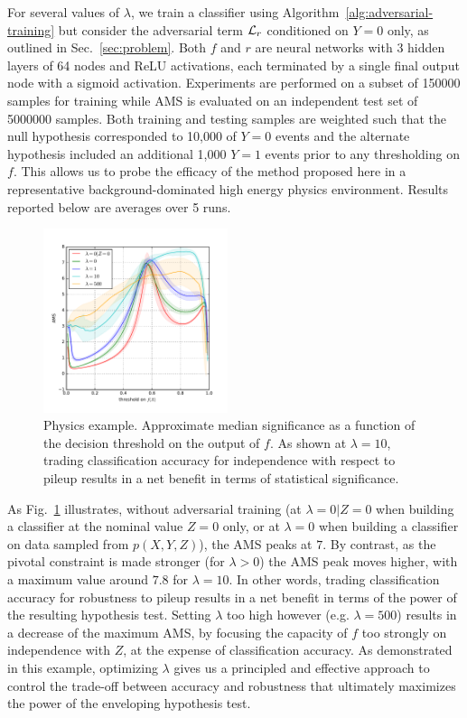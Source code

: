 \documentclass[twocolumn,superscriptaddress,aps]{revtex4-1}
\theoremstyle{plain}
\begin{document}
For several values of $\lambda$, we train a classifier
using  Algorithm~\ref{alg:adversarial-training} but consider the adversarial
term ${\cal L}_r$ conditioned on $Y=0$ only, as outlined in
Sec.~\ref{sec:problem}. Both $f$ and $r$ are neural networks with 3 hidden
layers of 64 nodes and ReLU activations, each terminated by a single final
output node with a sigmoid activation. Experiments are performed on a subset of
150000 samples for training while AMS is evaluated on an independent test set of
5000000 samples. Both training and testing samples are weighted such that the
null hypothesis corresponded to 10,000  of $Y=0$ events and the alternate
hypothesis included an additional 1,000 $Y=1$ events prior to any thresholding on $f$.
This allows us to probe the efficacy of the
method proposed here in a representative background-dominated high energy physics environment. 
Results reported below are averages over 5 runs.

\begin{figure}
    \includegraphics[width=0.48\textwidth]{figures/ams.pdf}
    \caption{Physics example. Approximate median significance as a function of the decision threshold
             on the output of $f$.  As shown at $\lambda=10$, trading
             classification accuracy for independence with respect to pileup
             results in a net benefit in terms of statistical significance.}
    \label{fig:physics-ams}
\end{figure}

As  Fig.~\ref{fig:physics-ams} illustrates, without adversarial training (at
$\lambda=0|Z=0$ when building a classifier at the nominal value $Z=0$ only, or
at $\lambda=0$ when building a classifier on data sampled from $p(X,Y,Z)$), the
AMS peaks at $7$. By contrast, as the pivotal constraint
is made stronger (for $\lambda > 0$) the AMS peak moves higher, with a maximum
value around  $7.8$ for $\lambda=10$. In other words, trading classification
accuracy for robustness to pileup results in a net
benefit in terms of the power of the resulting hypothesis test. Setting $\lambda$ too high however
(e.g. $\lambda=500$) results in a decrease of the maximum AMS, by
focusing the capacity of $f$ too strongly on independence with $Z$, at the expense of
classification accuracy. As demonstrated in this example, optimizing $\lambda$
gives us a principled and effective approach to control the trade-off between
accuracy and robustness that ultimately maximizes the
power of the enveloping hypothesis test.
\end{document}

